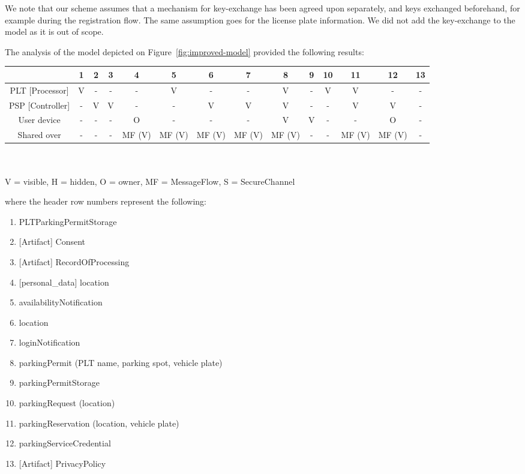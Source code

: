 We note that our scheme assumes that a mechanism for key-exchange has been
agreed upon separately, and keys exchanged beforehand, for example during the
registration flow. The same assumption goes for the license plate information.
We did not add the key-exchange to the model as it is out of scope.

\newpage
The analysis of the model depicted on Figure~\ref{fig:improved-model} provided
the following results:

\begin{center}
\begin{tabular}{ |c||c|c|c|c|c|c|c|c|c|c|c|c|c| } 
    \hline
    & 1 & 2 & 3 & 4 & 5 & 6 & 7 & 8 & 9 & 10 & 11 & 12 & 13\\ 
    \hline
    \hline
    PLT [Processor] & V & - & - & - & V & - & - & V & - & V & V & - & -\\
    \hline
    PSP [Controller] & - & V & V & - & - & V & V & V & - & - & V & V & -\\
    \hline
    User device & - & - & - & O & - & - & - & V & V & - & - & O & -\\
    \hline
    \hline
    Shared over & - & - & - &
    \multicolumn{1}{m{1.2em}|}{MF (V)} &
    \multicolumn{1}{m{1.2em}|}{MF (V)} &
    \multicolumn{1}{m{1.2em}|}{MF (V)} &
    \multicolumn{1}{m{1.2em}|}{MF (V)} &
    \multicolumn{1}{m{1.2em}|}{MF (V)} &
    - & - &
    \multicolumn{1}{m{1.2em}|}{MF (V)} &
    \multicolumn{1}{m{1.2em}|}{MF (V)} & -\\
    \hline
\end{tabular}
\\~\\
V = visible, H = hidden, O = owner, MF = MessageFlow, S = SecureChannel
\end{center}
where the header row numbers represent the following:
\begin{enumerate}
    \item PLTParkingPermitStorage
    \item {[Artifact]} Consent
    \item {[Artifact]} RecordOfProcessing
    \item {[personal\_data]} location
    \item availabilityNotification
    \item location
    \item loginNotification
    \item parkingPermit (PLT name, parking spot, vehicle plate)
    \item parkingPermitStorage
    \item parkingRequest (location)
    \item parkingReservation (location, vehicle plate)
    \item parkingServiceCredential
    \item {[Artifact]} PrivacyPolicy
\end{enumerate}

